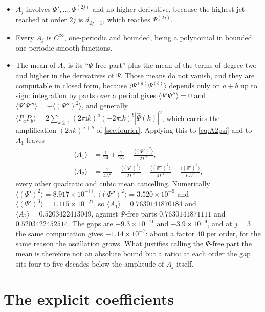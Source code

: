 \documentclass[11pt,oneside]{article}
\theoremstyle{definition}
\theoremstyle{remark}
\newcommand{\ii}{\mathrm i}
\newcommand{\Psihat}{\widehat\Psi}
\begin{document}
\begin{itemize}
\item $A_j$ involves $\Psi',\dots,\Psi^{(2j)}$ and no higher derivative,
  because the highest jet reached at order $2j$ is $d_{2j-1}$, which reaches
  $\Psi^{(2j)}$.
\item Every $A_j$ is $C^\infty$, one-periodic and bounded, being a polynomial
  in bounded one-periodic smooth functions.
\item The mean of $A_j$ is its ``$\Psi$-free part'' plus the mean of the
  terms of degree two and higher in the derivatives of $\Psi$.  Those means
  do not vanish, and they are computable in closed form, because
  $\langle\Psi^{(a)}\Psi^{(b)}\rangle$ depends only on $a+b$ up to sign:
  integration by parts over a period gives
  $\langle\Psi'\Psi''\rangle=0$ and
  $\langle\Psi'\Psi'''\rangle=-\langle(\Psi'')^2\rangle$, and generally
  $\langle P_aP_b\rangle=2\sum_{k\ge1}(2\pi\ii k)^a(-2\pi\ii k)^b|\Psihat(k)|^2$,
  which carries the amplification $(2\pi k)^{a+b}$ of \cref{sec:fourier}.
  Applying this to \cref{eq:A2psi} and to $A_1$ leaves
  \begin{align*}
    \langle A_1\rangle&=\frac1{24}+\frac1{2L}
      -\frac{\langle(\Psi')^2\rangle}{2L^2},\\
    \langle A_2\rangle&=\frac1{4L^2}
      -\frac{\langle(\Psi')^2\rangle}{2L^3}
      -\frac{\langle(\Psi'')^2\rangle}{4L^4}
      -\frac{\langle(\Psi')^3\rangle}{6L^3},
  \end{align*}
  every other quadratic and cubic mean cancelling.  Numerically
  $\langle(\Psi')^2\rangle=8.917\times10^{-11}$,
  $\langle(\Psi'')^2\rangle=3.520\times10^{-9}$ and
  $\langle(\Psi')^3\rangle=1.115\times10^{-21}$, so
  $\langle A_1\rangle=0.7630141870184$ and
  $\langle A_2\rangle=0.5203422413049$, against $\Psi$-free parts
  $0.7630141871111$ and $0.5203422452514$.  The gaps are
  $-9.3\times10^{-11}$ and $-3.9\times10^{-9}$, and at $j=3$ the same
  computation gives $-1.14\times10^{-7}$: about a factor $40$ per order,
  for the same reason the oscillation grows.  What justifies calling the
  $\Psi$-free part the mean is therefore not an absolute bound but a ratio:
  at each order the gap sits four to five decades below the amplitude of
  $A_j$ itself.
\end{itemize}

\section{The explicit coefficients}\label{sec:explicit}
\end{document}
